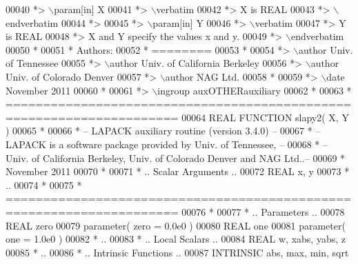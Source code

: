 \begin{DoxyCode}
00040 \textcolor{comment}{*> \(\backslash\)param[in] X}
00041 \textcolor{comment}{*> \(\backslash\)verbatim}
00042 \textcolor{comment}{*>          X is REAL}
00043 \textcolor{comment}{*> \(\backslash\)endverbatim}
00044 \textcolor{comment}{*>}
00045 \textcolor{comment}{*> \(\backslash\)param[in] Y}
00046 \textcolor{comment}{*> \(\backslash\)verbatim}
00047 \textcolor{comment}{*>          Y is REAL}
00048 \textcolor{comment}{*>          X and Y specify the values x and y.}
00049 \textcolor{comment}{*> \(\backslash\)endverbatim}
00050 \textcolor{comment}{*}
00051 \textcolor{comment}{*  Authors:}
00052 \textcolor{comment}{*  ========}
00053 \textcolor{comment}{*}
00054 \textcolor{comment}{*> \(\backslash\)author Univ. of Tennessee }
00055 \textcolor{comment}{*> \(\backslash\)author Univ. of California Berkeley }
00056 \textcolor{comment}{*> \(\backslash\)author Univ. of Colorado Denver }
00057 \textcolor{comment}{*> \(\backslash\)author NAG Ltd. }
00058 \textcolor{comment}{*}
00059 \textcolor{comment}{*> \(\backslash\)date November 2011}
00060 \textcolor{comment}{*}
00061 \textcolor{comment}{*> \(\backslash\)ingroup auxOTHERauxiliary}
00062 \textcolor{comment}{*}
00063 \textcolor{comment}{*  =====================================================================}
00064 \textcolor{keyword}{      REAL             }\textcolor{keyword}{FUNCTION }slapy2( X, Y )
00065 \textcolor{comment}{*}
00066 \textcolor{comment}{*  -- LAPACK auxiliary routine (version 3.4.0) --}
00067 \textcolor{comment}{*  -- LAPACK is a software package provided by Univ. of Tennessee,    --}
00068 \textcolor{comment}{*  -- Univ. of California Berkeley, Univ. of Colorado Denver and NAG Ltd..--}
00069 \textcolor{comment}{*     November 2011}
00070 \textcolor{comment}{*}
00071 \textcolor{comment}{*     .. Scalar Arguments ..}
00072       \textcolor{keywordtype}{REAL}               x, y
00073 \textcolor{comment}{*     ..}
00074 \textcolor{comment}{*}
00075 \textcolor{comment}{*  =====================================================================}
00076 \textcolor{comment}{*}
00077 \textcolor{comment}{*     .. Parameters ..}
00078       \textcolor{keywordtype}{REAL}               zero
00079       parameter( zero = 0.0e0 )
00080       \textcolor{keywordtype}{REAL}               one
00081       parameter( one = 1.0e0 )
00082 \textcolor{comment}{*     ..}
00083 \textcolor{comment}{*     .. Local Scalars ..}
00084       \textcolor{keywordtype}{REAL}               w, xabs, yabs, z
00085 \textcolor{comment}{*     ..}
00086 \textcolor{comment}{*     .. Intrinsic Functions ..}
00087       \textcolor{keywordtype}{INTRINSIC}          abs, max, min, sqrt

\end{DoxyCode}
